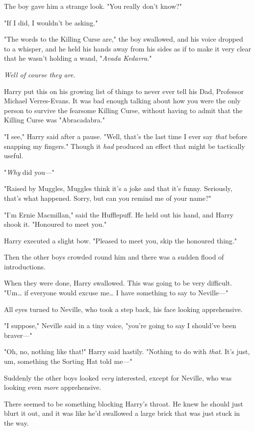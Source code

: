 The boy gave him a strange look. "You really don't know?"

"If I did, I wouldn't be asking."

"The words to the Killing Curse are," the boy swallowed, and his voice dropped
to a whisper, and he held his hands away from his sides as if to make it very
clear that he wasn't holding a wand, "\emph{Avada Kedavra.}"

\emph{Well of course they are.}

Harry put this on his growing list of things to never ever tell his Dad,
Professor Michael Verres-Evans. It was bad enough talking about how you were
the only person to survive the fearsome Killing Curse, without having to admit
that the Killing Curse was "Abracadabra."

"I see," Harry said after a pause. "Well, that's the last time I ever say
\emph{that} before snapping my fingers." Though it \emph{had} produced an
effect that might be tactically useful.

"\emph{Why} did you---"

"Raised by Muggles, Muggles think it's a joke and that it's funny. Seriously,
that's what happened. Sorry, but can you remind me of your name?"

"I'm Ernie Macmillan," said the Hufflepuff. He held out his hand, and Harry
shook it. "Honoured to meet you."

Harry executed a slight bow. "Pleased to meet you, skip the honoured thing."

Then the other boys crowded round him and there was a sudden flood of
introductions.

When they were done, Harry swallowed. This was going to be very difficult.
"Um{\ldots} if everyone would excuse me{\ldots} I have something to say to
Neville---"

All eyes turned to Neville, who took a step back, his face looking apprehensive.

"I suppose," Neville said in a tiny voice, "you're going to say I should've
been braver---"

"Oh, no, nothing like that!" Harry said hastily. "Nothing to do with
\emph{that}. It's just, um, something the Sorting Hat told me---"

Suddenly the other boys looked \emph{very} interested, except for Neville, who
was looking even \emph{more} apprehensive.

There seemed to be something blocking Harry's throat. He knew he should just
blurt it out, and it was like he'd swallowed a large brick that was just stuck
in the way.

